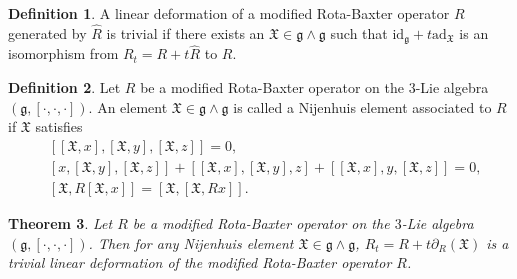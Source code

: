 \documentclass[12pt]{amsart}
\newtheorem{theorem}{Theorem}[section]
\theoremstyle{definition}
\newtheorem{defn}[theorem]{Definition}
\begin{document}
\begin{defn}
A linear deformation of a modified Rota-Baxter operator $R$ generated by $\hat{R}$  is trivial if there
 exists an $\mathfrak{X}\in \mathfrak{g}\wedge \mathfrak{g}$ such that $\mathrm{id}_\mathfrak{g}+t\mathrm{ad}_{\mathfrak{X}}$ is an isomorphism from  $R_t = R + t\hat{R}$ to $R$.
\end{defn}

\begin{defn}
Let $R$ be a modified Rota-Baxter operator on the $3$-Lie algebra $(\mathfrak{g}, [\cdot, \cdot, \cdot])$. An element $\mathfrak{X}\in \mathfrak{g}\wedge \mathfrak{g}$  is called
 a Nijenhuis element associated to $R$ if $\mathfrak{X}$ satisfies
 \begin{align}
& [[\mathfrak{X}, x],[\mathfrak{X}, y],[\mathfrak{X}, z]]=0,\label{6.5}\\
& [x, [\mathfrak{X}, y],[\mathfrak{X}, z]]+[[\mathfrak{X}, x], [\mathfrak{X}, y], z]+[[\mathfrak{X}, x],y,[\mathfrak{X}, z]]=0,\label{6.6}\\
& [\mathfrak{X}, R[\mathfrak{X}, x]] =[\mathfrak{X}, [\mathfrak{X}, Rx]].\label{6.7}
\end{align}
 \end{defn}
 \begin{theorem}
 Let $R$ be a modified Rota-Baxter operator on the $3$-Lie algebra $(\mathfrak{g}, [\cdot, \cdot, \cdot])$. Then for any Nijenhuis element
$\mathfrak{X}\in \mathfrak{g}\wedge \mathfrak{g}$, $R_t =R+t\partial_R(\mathfrak{X})$ is a trivial linear deformation of the modified Rota-Baxter operator $R$.
\end{theorem}
\end{document}
